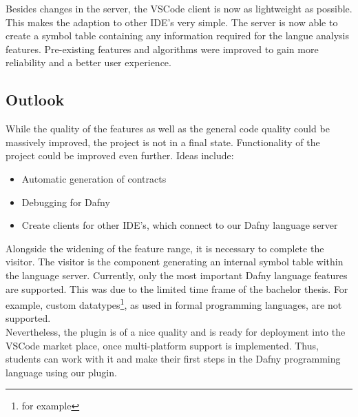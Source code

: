 Besides changes in the server, the VSCode client is now as lightweight as possible.
This makes the adaption to other IDE's very simple.
The server is now able to create a symbol table containing any information required for the langue analysis features.
Pre-existing features and algorithms were improved to gain more reliability and a better user experience.

\subsection{Outlook}
While the quality of the features as well as the general code quality could be massively improved, the project is not in a final state.
Functionality of the project could be improved even further.
Ideas include:
\begin{itemize}
    \item Automatic generation of contracts
    \item Debugging for Dafny
    \item Create clients for other IDE's, which connect to our Dafny language server
\end{itemize}

Alongside the widening of the feature range, it is necessary to complete the visitor.
The visitor is the component generating an internal symbol table within the language server.
Currently, only the most important Dafny language features are supported.
This was due to the limited time frame of the bachelor thesis.
For example, custom datatypes\footnote{for example }, as used in formal programming languages, are not supported.\\

Nevertheless, the plugin is of a nice quality and is ready for deployment into the VSCode market place, once multi-platform support is implemented.
Thus, students can work with it and make their first steps in the Dafny programming language using our plugin.
